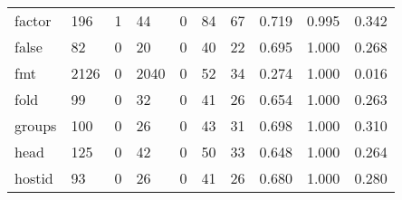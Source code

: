 \begin{longtable}{lp{2.0cm}p{2.0cm}p{2.0cm}p{2.0cm}p{2.0cm}p{2.0cm}p{2.0cm}p{2.0cm}p{2.0cm}}
factor    &                    196 &                                  1 &                                44 &                                0 &                                84 &                              67 &                                0.719 &                                  0.995 &                                0.342 \\
false     &                     82 &                                  0 &                                20 &                                0 &                                40 &                              22 &                                0.695 &                                  1.000 &                                0.268 \\
fmt       &                   2126 &                                  0 &                              2040 &                                0 &                                52 &                              34 &                                0.274 &                                  1.000 &                                0.016 \\
fold      &                     99 &                                  0 &                                32 &                                0 &                                41 &                              26 &                                0.654 &                                  1.000 &                                0.263 \\
groups    &                    100 &                                  0 &                                26 &                                0 &                                43 &                              31 &                                0.698 &                                  1.000 &                                0.310 \\
head      &                    125 &                                  0 &                                42 &                                0 &                                50 &                              33 &                                0.648 &                                  1.000 &                                0.264 \\
hostid    &                     93 &                                  0 &                                26 &                                0 &                                41 &                              26 &                                0.680 &                                  1.000 &                                0.280 \\

\end{longtable}
